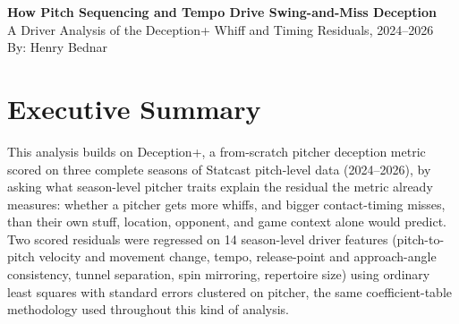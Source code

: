 \documentclass[11pt]{article}
\begin{document}
\begin{center}
{\Large\bfseries\color{hdrblue} How Pitch Sequencing and Tempo Drive Swing-and-Miss Deception}\\[0.3em]
{\normalsize A Driver Analysis of the Deception+ Whiff and Timing Residuals, 2024--2026}\\[0.8em]
{\normalsize By: Henry Bednar}
\end{center}

\vspace{0.5em}

\section*{Executive Summary}
This analysis builds on Deception+, a from-scratch pitcher deception metric scored on three complete seasons of Statcast pitch-level data (2024--2026), by asking what season-level pitcher traits explain the residual the metric already measures: whether a pitcher gets more whiffs, and bigger contact-timing misses, than their own stuff, location, opponent, and game context alone would predict. Two scored residuals were regressed on 14 season-level driver features (pitch-to-pitch velocity and movement change, tempo, release-point and approach-angle consistency, tunnel separation, spin mirroring, repertoire size) using ordinary least squares with standard errors clustered on pitcher, the same coefficient-table methodology used throughout this kind of analysis.
\end{document}

